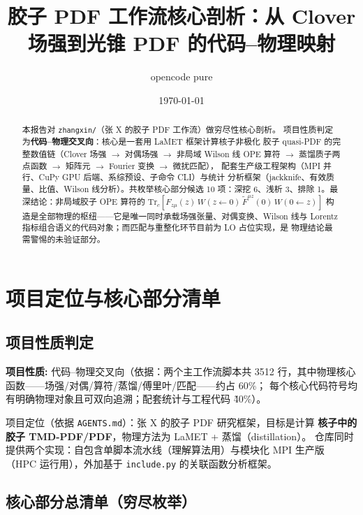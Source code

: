 \documentclass[UTF8]{ctexart}
\title{胶子 PDF 工作流核心剖析：从 Clover 场强到光锥 PDF 的代码--物理映射}
\author{opencode pure}
\date{\today}
\begin{document}
\maketitle

\begin{abstract}
本报告对 \texttt{zhangxin/}（张 X 的胶子 PDF 工作流）做穷尽性核心剖析。
项目性质判定为\textbf{代码--物理交叉向}：核心是一套用 LaMET 框架计算核子非极化
胶子 quasi-PDF 的完整数值链（Clover 场强 $\to$ 对偶场强 $\to$ 非局域 Wilson 线
OPE 算符 $\to$ 蒸馏质子两点函数 $\to$ 矩阵元 $\to$ Fourier 变换 $\to$ 微扰匹配），
配套生产级工程架构（MPI 并行、CuPy GPU 后端、系综预设、子命令 CLI）与统计
分析框架（jackknife、有效质量、比值、Wilson 线分析）。共枚举核心部分候选
10 项：深挖 6、浅析 3、排除 1。最深结论：非局域胶子 OPE 算符的
$\mathrm{Tr}_c[F_{z\mu}(z)\,W(z{\leftarrow}0)\,\tilde{F}^{\mu z}(0)\,W(0{\leftarrow}z)]$
构造是全部物理的枢纽——它是唯一同时承载场强张量、对偶变换、Wilson 线与
Lorentz 指标组合语义的代码对象；而匹配与重整化环节目前为 LO 占位实现，是
物理结论最需警惕的未验证部分。
\end{abstract}

\tableofcontents

\section{项目定位与核心部分清单}

\subsection{项目性质判定}

\begin{keybox}
\textbf{项目性质:} \textcolor{phys}{代码--物理交叉向}（依据：两个主工作流脚本共
3512 行，其中物理核心函数——场强/对偶/算符/蒸馏/傅里叶/匹配——约占 60\%；
每个核心代码符号均有明确物理对象且可双向追溯；配套统计与工程代码
\~40\%）。
\end{keybox}

项目定位（依据 \texttt{AGENTS.md}）：张 X 的胶子 PDF 研究框架，目标是计算
\textbf{核子中的胶子 TMD-PDF/PDF}，物理方法为 LaMET + 蒸馏（distillation）。
仓库同时提供两个实现：自包含单脚本流水线（理解算法用）与模块化 MPI 生产版
（HPC 运行用），外加基于 \texttt{include.py} 的关联函数分析框架。

\subsection{核心部分总清单（穷尽枚举）}
\end{document}
